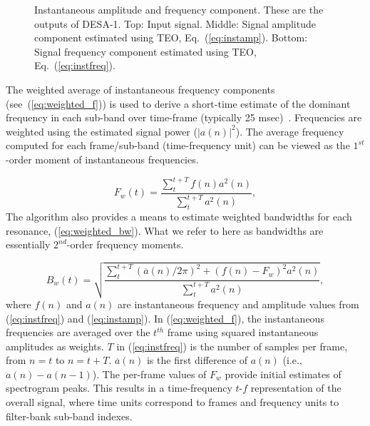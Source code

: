 {\begin{figure}[!t]
\begin{subfigure}[b]{3.5in}
	\end{subfigure}
	\vspace{-1mm}
	\caption{Instantaneous amplitude and frequency component. These are the outputs of DESA-1. Top: Input signal. Middle: Signal amplitude component estimated using TEO, Eq.~(\ref{eq:instamp}). Bottom: Signal frequency component estimated using TEO, Eq.~(\ref{eq:instfreq}).}
	\label{fig:desa1}
\end{figure}


The weighted average of instantaneous frequency components (see~(\ref{eq:weighted_f})) is used to derive a short-time estimate of the dominant frequency in each sub-band over time-frame (typically 25 msec)~\cite{cohenlee90}. 
Frequencies are weighted using the estimated signal power ($|a(n)|^2$). 
The average frequency computed for each frame/sub-band (time-frequency unit) can be viewed as the $1^{st}$-order moment of instantaneous frequencies.  


\begin{equation}
\label{eq:weighted_f}
F_w(t) = \frac{\sum_{t}^{t+T}f(n)a^2(n)}{\sum_{t}^{t+T}a^2(n)},
\end{equation}
The algorithm also provides a means to estimate weighted bandwidths for each resonance, (\ref{eq:weighted_bw}). 
What we refer to here as bandwidths are essentially $2^{nd}$-order frequency moments. 

\begin{equation}
\label{eq:weighted_bw}
B_w(t) = \sqrt{\frac{\sum_{t}^{t+T}(\overset{\boldsymbol .}{a}(n) /2\pi)^2+(f(n)-F_w)^2a^2(n)}{\sum_{t}^{t+T}a^2(n)}},
\end{equation}
where $f(n)$ and $a(n)$ are instantaneous frequency and amplitude values from (\ref{eq:instfreq}) and (\ref{eq:instamp}). 
In (\ref{eq:weighted_f}), the instantaneous frequencies are averaged over the $t^{th}$ frame using squared instantaneous amplitudes as weights. 
$T$ in (\ref{eq:instfreq}) is the number of samples per frame, from $n = t$ to $n = t+T$. 
$\overset{\boldsymbol .}{a}(n)$ is the first difference of $a(n)$ (i.e., $a(n) - a(n-1)$). 
The per-frame values of $F_w$ provide initial estimates of spectrogram peaks. 
This results in a time-frequency {$t$-$f$} representation of the overall signal, where time units correspond to frames and frequency units to filter-bank sub-band indexes. 


}
